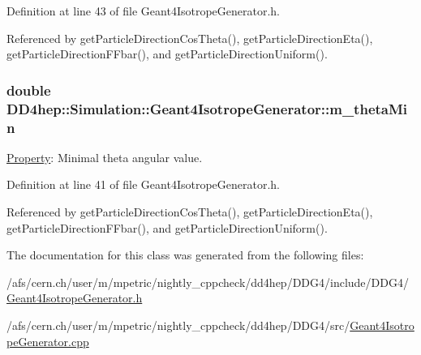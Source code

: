Definition at line 43 of file Geant4IsotropeGenerator.h.

Referenced by getParticleDirectionCosTheta(), getParticleDirectionEta(), getParticleDirectionFFbar(), and getParticleDirectionUniform().\hypertarget{class_d_d4hep_1_1_simulation_1_1_geant4_isotrope_generator_adc75b47a005e8632d01d3db7b408de4c}{
\subsubsection[{m\_\-thetaMin}]{\setlength{\rightskip}{0pt plus 5cm}double {\bf DD4hep::Simulation::Geant4IsotropeGenerator::m\_\-thetaMin}}}
\label{class_d_d4hep_1_1_simulation_1_1_geant4_isotrope_generator_adc75b47a005e8632d01d3db7b408de4c}


\hyperlink{class_d_d4hep_1_1_property}{Property}: Minimal theta angular value. 

Definition at line 41 of file Geant4IsotropeGenerator.h.

Referenced by getParticleDirectionCosTheta(), getParticleDirectionEta(), getParticleDirectionFFbar(), and getParticleDirectionUniform().

The documentation for this class was generated from the following files:\begin{DoxyCompactItemize}
\item 
/afs/cern.ch/user/m/mpetric/nightly\_\-cppcheck/dd4hep/DDG4/include/DDG4/\hyperlink{_geant4_isotrope_generator_8h}{Geant4IsotropeGenerator.h}\item 
/afs/cern.ch/user/m/mpetric/nightly\_\-cppcheck/dd4hep/DDG4/src/\hyperlink{_geant4_isotrope_generator_8cpp}{Geant4IsotropeGenerator.cpp}\end{DoxyCompactItemize}
